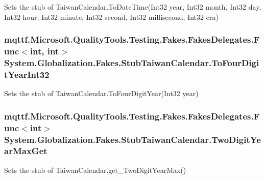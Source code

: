 Sets the stub of Taiwan\-Calendar.\-To\-Date\-Time(\-Int32 year, Int32 month, Int32 day, Int32 hour, Int32 minute, Int32 second, Int32 millisecond, Int32 era)

\hypertarget{class_system_1_1_globalization_1_1_fakes_1_1_stub_taiwan_calendar_a323456f5ac1ce71c37afd874569bf481}{
\subsubsection[{To\-Four\-Digit\-Year\-Int32}]{\setlength{\rightskip}{0pt plus 5cm}mqttf.\-Microsoft.\-Quality\-Tools.\-Testing.\-Fakes.\-Fakes\-Delegates.\-Func$<$int, int$>$ System.\-Globalization.\-Fakes.\-Stub\-Taiwan\-Calendar.\-To\-Four\-Digit\-Year\-Int32}}\label{class_system_1_1_globalization_1_1_fakes_1_1_stub_taiwan_calendar_a323456f5ac1ce71c37afd874569bf481}


Sets the stub of Taiwan\-Calendar.\-To\-Four\-Digit\-Year(\-Int32 year)

\hypertarget{class_system_1_1_globalization_1_1_fakes_1_1_stub_taiwan_calendar_a06f68f4b86b79441fc83d60adfa2e890}{
\subsubsection[{Two\-Digit\-Year\-Max\-Get}]{\setlength{\rightskip}{0pt plus 5cm}mqttf.\-Microsoft.\-Quality\-Tools.\-Testing.\-Fakes.\-Fakes\-Delegates.\-Func$<$int$>$ System.\-Globalization.\-Fakes.\-Stub\-Taiwan\-Calendar.\-Two\-Digit\-Year\-Max\-Get}}\label{class_system_1_1_globalization_1_1_fakes_1_1_stub_taiwan_calendar_a06f68f4b86b79441fc83d60adfa2e890}


Sets the stub of Taiwan\-Calendar.\-get\-\_\-\-Two\-Digit\-Year\-Max()

